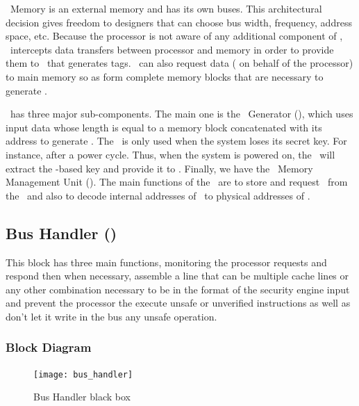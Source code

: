 \ptag~Memory is an external memory and has its own buses. This architectural decision gives freedom to designers that can choose bus width, frequency, address space, etc. Because the processor is not aware of any additional component of \cshia, \handler~intercepts data transfers between processor and memory in order to provide them to \seceng~that generates tags. \handler~can also request data ( on behalf of the processor) to main memory so as  form complete memory blocks that are necessary to generate \ptags.

\seceng~has three major sub-components. The main one is the \ptag~Generator (\ptaggen), which uses input data whose length is equal to a memory block concatenated with its address to generate \ptags. The \fuzzy~is only used when the system loses its secret key. For instance, after a power cycle. Thus, when the system is powered on, the \fuzzy~will extract the \puf-based key and provide it to \ptaggen. Finally, we have the \ptag~Memory Management Unit (\pmmu). The main functions of the \pmmu~are to store and request \ptags~from the \ptagmem~and also to decode internal addresses of \ptags~to physical addresses of \ptagmem. 


\subsection{Bus Handler (\handler)}
This block has three main functions, monitoring the processor requests and respond then when necessary, 
assemble a line %
that can be multiple cache lines or any other combination necessary to be in the format
 of the security engine input  and prevent the processor the execute unsafe or unverified instructions
 as well as don't let  it  write in the bus any unsafe operation.
\subsubsection{Block Diagram}

\begin{figure}[!ht]
	\centering
	\texttt{[image: bus\_handler]}
    \caption{Bus Handler  black box  }
	\label{fig:bhbb}
\end{figure}


